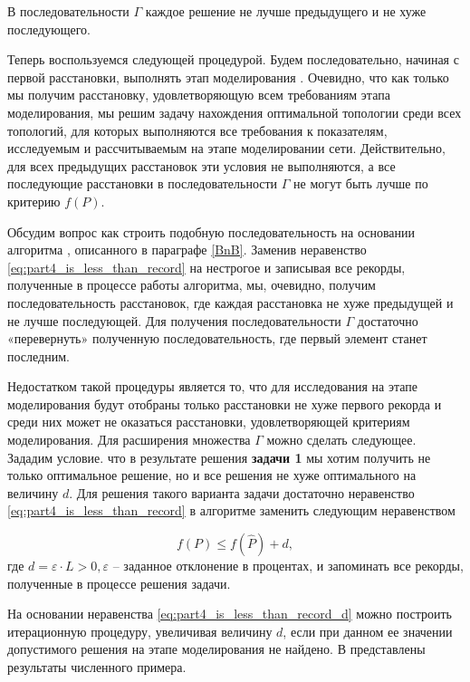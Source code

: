 В последовательности $\Gamma$ каждое решение не лучше предыдущего и не хуже последующего.

Теперь воспользуемся следующей процедурой. Будем последовательно, начиная с первой расстановки, выполнять этап моделирования . Очевидно, что как только мы получим расстановку, удовлетворяющую всем требованиям этапа моделирования, мы решим задачу нахождения оптимальной топологии среди всех топологий, для которых выполняются все требования к показателям, исследуемым и рассчитываемым на этапе моделировании сети. Действительно, для всех предыдущих расстановок эти условия не выполняются, а все последующие расстановки в последовательности $\Gamma$ не могут быть лучше по критерию $f(P)$.

Обсудим вопрос как строить подобную последовательность на основании алгоритма , описанного в параграфе \cref{BnB}. Заменив неравенство \cref{eq:part4_is_less_than_record} на нестрогое и записывая все рекорды, полученные в процессе работы алгоритма, мы, очевидно, получим последовательность расстановок, где каждая расстановка не хуже предыдущей и не лучше последующей. Для получения последовательности $\Gamma$ достаточно «перевернуть» полученную последовательность, где первый элемент станет последним.

Недостатком такой процедуры является то, что для исследования на этапе моделирования будут отобраны только расстановки не хуже первого рекорда и среди них может не оказаться расстановки, удовлетворяющей критериям моделирования.
Для расширения множества $\Gamma$ можно сделать следующее. Зададим условие. что в результате решения \textbf{задачи 1} мы хотим получить не только оптимальное решение, но и все решения не хуже оптимального на величину $d$. Для решения такого варианта задачи достаточно неравенство \cref{eq:part4_is_less_than_record} в алгоритме  заменить следующим неравенством 

\begin{equation}
    \label{eq:part4_is_less_than_record_d}
    f(P) \leqslant f(\widehat{P}) + d,
\end{equation}
где $d = \varepsilon \cdot L > 0, \varepsilon$ -- заданное отклонение в процентах, и запоминать все рекорды, полученные в процессе решения задачи.

На основании неравенства \cref{eq:part4_is_less_than_record_d} можно построить итерационную процедуру, увеличивая величину $d$, если при данном ее значении допустимого решения на этапе моделирования не найдено.
В  представлены результаты численного примера.

